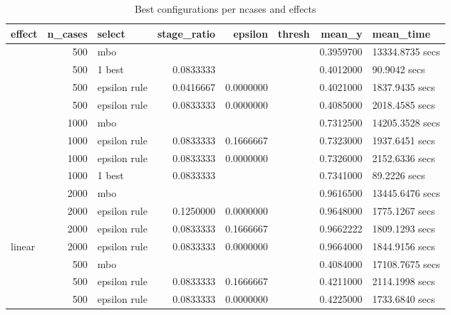
\begin{longtable}[t]{lrlrrrrl}
\caption{\label{tab:table_best}Best configurations per ncases and effects}\\
\toprule
effect & n\_cases & select & stage\_ratio & epsilon & thresh & mean\_y & mean\_time\\
\midrule
 & 500 & mbo &  &  &  & 0.3959700 & 13334.8735 secs\\

 & 500 & 1 best & 0.0833333 &  &  & 0.4012000 & 90.9042 secs\\

 & 500 & epsilon rule & 0.0416667 & 0.0000000 &  & 0.4021000 & 1837.9435 secs\\

 & 500 & epsilon rule & 0.0833333 & 0.0000000 &  & 0.4085000 & 2018.4585 secs\\

 & 1000 & mbo &  &  &  & 0.7312500 & 14205.3528 secs\\

 & 1000 & epsilon rule & 0.0833333 & 0.1666667 &  & 0.7323000 & 1937.6451 secs\\

 & 1000 & epsilon rule & 0.0833333 & 0.0000000 &  & 0.7326000 & 2152.6336 secs\\

 & 1000 & 1 best & 0.0833333 &  &  & 0.7341000 & 89.2226 secs\\

 & 2000 & mbo &  &  &  & 0.9616500 & 13445.6476 secs\\

 & 2000 & epsilon rule & 0.1250000 & 0.0000000 &  & 0.9648000 & 1775.1267 secs\\

 & 2000 & epsilon rule & 0.0833333 & 0.1666667 &  & 0.9662222 & 1809.1293 secs\\

\multirow{-12}{*}{\raggedright\arraybackslash linear} & 2000 & epsilon rule & 0.0833333 & 0.0000000 &  & 0.9664000 & 1844.9156 secs\\
\cmidrule{1-8}
 & 500 & mbo &  &  &  & 0.4084000 & 17108.7675 secs\\

 & 500 & epsilon rule & 0.0833333 & 0.1666667 &  & 0.4211000 & 2114.1998 secs\\

 & 500 & epsilon rule & 0.0833333 & 0.0000000 &  & 0.4225000 & 1733.6840 secs\\


\end{longtable}
